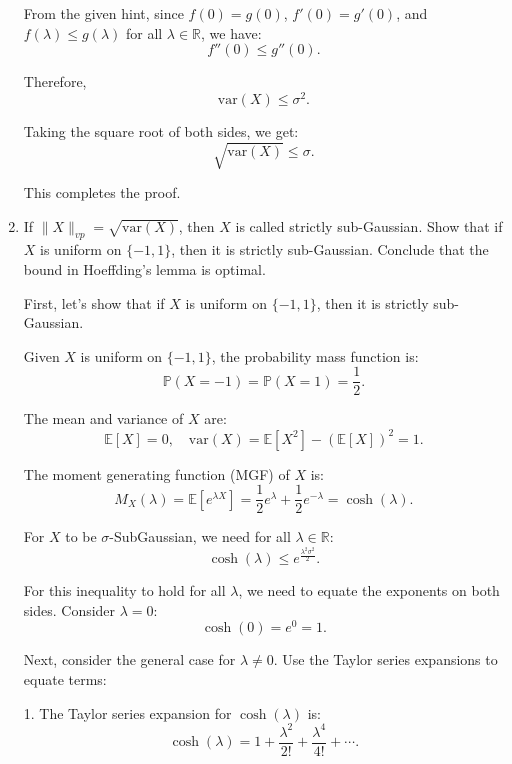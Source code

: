 \documentclass[a4 paper]{article}
\theoremstyle{boldStyle}
\theoremstyle{boldBlueStyle}
\theoremstyle{boldPurpleStyle}
\theoremstyle{boldRedStyle}
\begin{document}
\begin{enumerate}
From the given hint, since \(f(0) = g(0)\), \(f'(0) = g'(0)\), and \(f(\lambda) \leq g(\lambda)\) for all \(\lambda \in \mathbb{R}\), we have:
\[
f''(0) \leq g''(0).
\]

Therefore,
\[
\mathrm{var}(X) \leq \sigma^2.
\]

Taking the square root of both sides, we get:
\[
\sqrt{\mathrm{var}(X)} \leq \sigma.
\]

This completes the proof.



















\newpage
\item \textcolor{blueColor}{If \(\|X\|_{vp} = \sqrt{\mathrm{var}(X)}\), then \(X\) is called strictly sub-Gaussian. 
Show that if \(X\) is uniform on \(\{-1, 1\}\), then it is strictly sub-Gaussian. Conclude that the bound in Hoeffding's lemma is optimal.}

\bigbreak

First, let's show that if \(X\) is uniform on \(\{-1, 1\}\), then it is strictly sub-Gaussian.

Given \(X\) is uniform on \(\{-1, 1\}\), the probability mass function is:
\[
\mathbb{P}(X = -1) = \mathbb{P}(X = 1) = \frac{1}{2}.
\]

The mean and variance of \(X\) are:
\[
\mathbb{E}[X] = 0, \quad \mathrm{var}(X) = \mathbb{E}[X^2] - (\mathbb{E}[X])^2 = 1.
\]

The moment generating function (MGF) of \(X\) is:
\[
M_X(\lambda) = \mathbb{E}[e^{\lambda X}] = \frac{1}{2} e^{\lambda} + \frac{1}{2} e^{-\lambda} = \cosh(\lambda).
\]

For \(X\) to be \(\sigma\)-SubGaussian, we need for all \(\lambda \in \mathbb{R}\):
\[
\cosh(\lambda) \leq e^{\frac{\lambda^2 \sigma^2}{2}}.
\]

For this inequality to hold for all \(\lambda\), we need to equate the exponents on both sides. Consider \(\lambda = 0\):
\[
\cosh(0) = e^{0} = 1.
\]

Next, consider the general case for \(\lambda \neq 0\). Use the Taylor series expansions to equate terms:

1. The Taylor series expansion for \(\cosh(\lambda)\) is:
\[
\cosh(\lambda) = 1 + \frac{\lambda^2}{2!} + \frac{\lambda^4}{4!} + \cdots.
\]


\end{enumerate}
\end{document}
